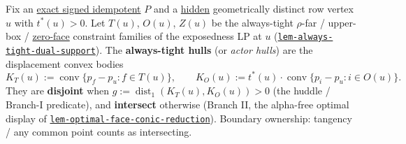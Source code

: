 \hypertarget{def:actor-hull}{}%
\begin{definition}\label{def:actor-hull}
Fix an \hyperref[def:signed-idempotent]{exact signed idempotent} $P$ and a
\hyperref[def:exposed]{hidden} geometrically distinct row vertex $u$ with $t^*(u)>0$. Let $T(u)$, $O(u)$,
$Z(u)$ be the always-tight $\rho$-far / upper-box / \hyperref[def:zero-face]{zero-face} constraint families of
the exposedness LP at $u$ (\hyperlink{dag:lem-always-tight-dual-support}{\texttt{lem-\allowbreak{}always-\allowbreak{}tight-\allowbreak{}dual-\allowbreak{}support}}). The \textbf{always-tight hulls} (or \emph{actor
hulls}) are the displacement convex bodies
\[K_T(u):=\operatorname{conv}\{p_f-p_u:f\in T(u)\},\qquad
  K_O(u):=t^*(u)\cdot\operatorname{conv}\{p_i-p_u:i\in O(u)\}.\]
They are \textbf{disjoint} when $g:=\operatorname{dist}_1(K_T(u),K_O(u))>0$ (the huddle / Branch-I
predicate), and \textbf{intersect} otherwise (Branch II, the alpha-free optimal display of
\hyperlink{dag:lem-optimal-face-conic-reduction}{\texttt{lem-\allowbreak{}optimal-\allowbreak{}face-\allowbreak{}conic-\allowbreak{}reduction}}). Boundary ownership: tangency / any common point counts as
intersecting.
\end{definition}

